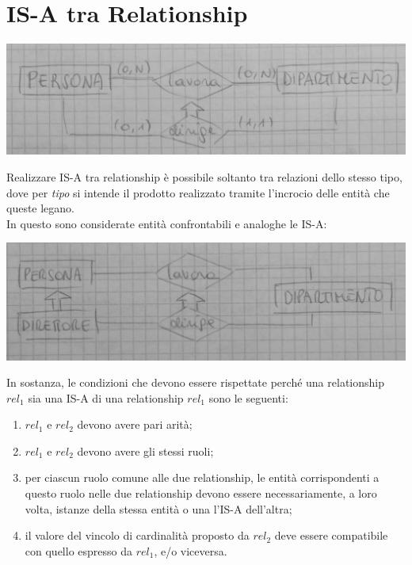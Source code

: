 \section{IS-A tra Relationship}
\begin{center}
    \includegraphics[width=.7\textwidth]{res/er-isa-relationship.jpg} \hfill
\end{center}
Realizzare IS-A tra relationship è possibile soltanto tra relazioni dello stesso tipo, dove per \textit{tipo} si intende il prodotto realizzato tramite l'incrocio delle entità che queste legano. \\
In questo sono considerate entità confrontabili e analoghe le IS-A:
\begin{center}
    \includegraphics[width=.7\textwidth]{res/er-isa-relationship-isa-entities.jpg} \hfill
\end{center}
In sostanza, le condizioni che devono essere rispettate perché una relationship $rel_{1}$ sia una IS-A di una relationship $rel_{1}$ sono le seguenti:
\begin{enumerate}
    \item $rel_{1}$ e $rel_{2}$ devono avere pari arità;
    \item $rel_{1}$ e $rel_{2}$ devono avere gli stessi ruoli;
    \item per ciascun ruolo comune alle due relationship, le entità corrispondenti a questo ruolo nelle due relationship devono essere necessariamente, a loro volta, istanze della stessa entità o una l'IS-A dell'altra;
    \item il valore del vincolo di cardinalità proposto da $rel_{2}$ deve essere compatibile con quello espresso da $rel_{1}$, e/o viceversa.
\end{enumerate}

